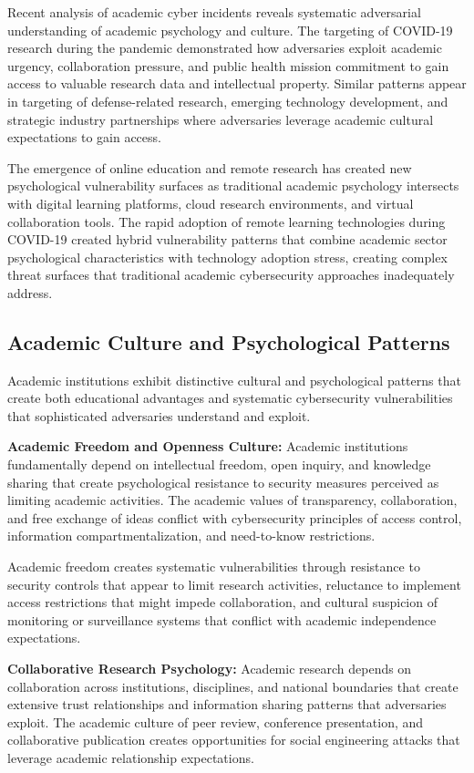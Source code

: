 \documentclass[10pt, twocolumn]{article}
\begin{document}
Recent analysis of academic cyber incidents reveals systematic adversarial understanding of academic psychology and culture. The targeting of COVID-19 research during the pandemic demonstrated how adversaries exploit academic urgency, collaboration pressure, and public health mission commitment to gain access to valuable research data and intellectual property. Similar patterns appear in targeting of defense-related research, emerging technology development, and strategic industry partnerships where adversaries leverage academic cultural expectations to gain access.

The emergence of online education and remote research has created new psychological vulnerability surfaces as traditional academic psychology intersects with digital learning platforms, cloud research environments, and virtual collaboration tools. The rapid adoption of remote learning technologies during COVID-19 created hybrid vulnerability patterns that combine academic sector psychological characteristics with technology adoption stress, creating complex threat surfaces that traditional academic cybersecurity approaches inadequately address.

\subsection{Academic Culture and Psychological Patterns}

Academic institutions exhibit distinctive cultural and psychological patterns that create both educational advantages and systematic cybersecurity vulnerabilities that sophisticated adversaries understand and exploit.

\textbf{Academic Freedom and Openness Culture:} Academic institutions fundamentally depend on intellectual freedom, open inquiry, and knowledge sharing that create psychological resistance to security measures perceived as limiting academic activities. The academic values of transparency, collaboration, and free exchange of ideas conflict with cybersecurity principles of access control, information compartmentalization, and need-to-know restrictions.

Academic freedom creates systematic vulnerabilities through resistance to security controls that appear to limit research activities, reluctance to implement access restrictions that might impede collaboration, and cultural suspicion of monitoring or surveillance systems that conflict with academic independence expectations.

\textbf{Collaborative Research Psychology:} Academic research depends on collaboration across institutions, disciplines, and national boundaries that create extensive trust relationships and information sharing patterns that adversaries exploit. The academic culture of peer review, conference presentation, and collaborative publication creates opportunities for social engineering attacks that leverage academic relationship expectations.
\end{document}
